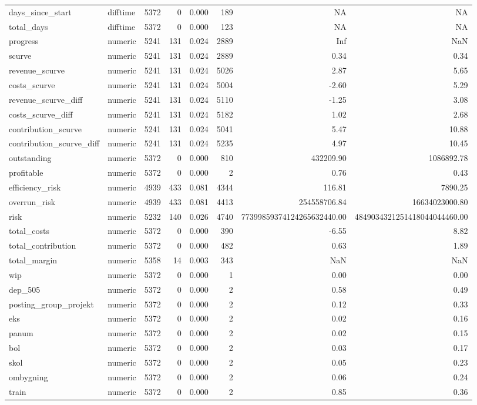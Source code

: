 \begin{landscape}
\begin{longtable}[t]{llrrrrrr}
days\_since\_start & difftime & 5372 & 0 & 0.000 & 189 & NA & NA\\
total\_days & difftime & 5372 & 0 & 0.000 & 123 & NA & NA\\
progress & numeric & 5241 & 131 & 0.024 & 2889 & Inf & NaN\\
scurve & numeric & 5241 & 131 & 0.024 & 2889 & 0.34 & 0.34\\
revenue\_scurve & numeric & 5241 & 131 & 0.024 & 5026 & 2.87 & 5.65\\
costs\_scurve & numeric & 5241 & 131 & 0.024 & 5004 & -2.60 & 5.29\\
revenue\_scurve\_diff & numeric & 5241 & 131 & 0.024 & 5110 & -1.25 & 3.08\\
costs\_scurve\_diff & numeric & 5241 & 131 & 0.024 & 5182 & 1.02 & 2.68\\
contribution\_scurve & numeric & 5241 & 131 & 0.024 & 5041 & 5.47 & 10.88\\
contribution\_scurve\_diff & numeric & 5241 & 131 & 0.024 & 5235 & 4.97 & 10.45\\
outstanding & numeric & 5372 & 0 & 0.000 & 810 & 432209.90 & 1086892.78\\
profitable & numeric & 5372 & 0 & 0.000 & 2 & 0.76 & 0.43\\
efficiency\_risk & numeric & 4939 & 433 & 0.081 & 4344 & 116.81 & 7890.25\\
overrun\_risk & numeric & 4939 & 433 & 0.081 & 4413 & 254558706.84 & 16634023000.80\\
risk & numeric & 5232 & 140 & 0.026 & 4740 & 77399859374124265632440.00 & 4849034321251418044044460.00\\
total\_costs & numeric & 5372 & 0 & 0.000 & 390 & -6.55 & 8.82\\
total\_contribution & numeric & 5372 & 0 & 0.000 & 482 & 0.63 & 1.89\\
total\_margin & numeric & 5358 & 14 & 0.003 & 343 & NaN & NaN\\
wip & numeric & 5372 & 0 & 0.000 & 1 & 0.00 & 0.00\\
dep\_505 & numeric & 5372 & 0 & 0.000 & 2 & 0.58 & 0.49\\
posting\_group\_projekt & numeric & 5372 & 0 & 0.000 & 2 & 0.12 & 0.33\\
eks & numeric & 5372 & 0 & 0.000 & 2 & 0.02 & 0.16\\
panum & numeric & 5372 & 0 & 0.000 & 2 & 0.02 & 0.15\\
bol & numeric & 5372 & 0 & 0.000 & 2 & 0.03 & 0.17\\
skol & numeric & 5372 & 0 & 0.000 & 2 & 0.05 & 0.23\\
ombygning & numeric & 5372 & 0 & 0.000 & 2 & 0.06 & 0.24\\
train & numeric & 5372 & 0 & 0.000 & 2 & 0.85 & 0.36\\*
\end{longtable}
\end{landscape}
\endgroup{}
